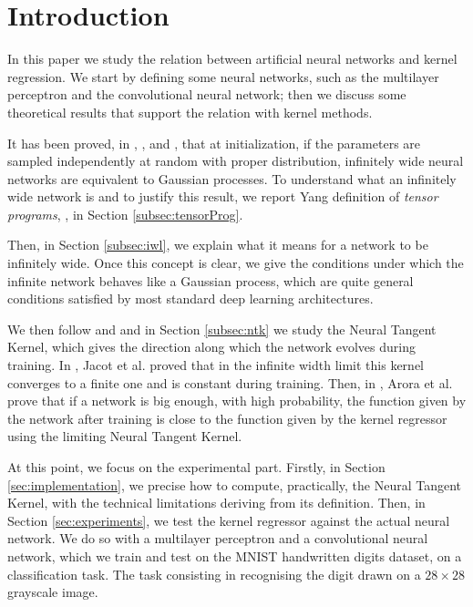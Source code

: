 \documentclass[11pt,notitlepage]{article}
\numberwithin{equation}{section}
\theoremstyle{remark}
\theoremstyle{definition}
\begin{document}
	\tableofcontents		
	
	\newpage
	    
	\section{Introduction}\label{sec:Introduction}
	In this paper we study the relation between artificial neural networks and kernel regression.
	We start by defining some neural networks, such as the multilayer perceptron and the convolutional neural network; then we discuss some theoretical results that support the relation with kernel methods.
	
	It has been proved, in \cite{neal2012bayesian}, \cite{jacot2018neural}, and \cite{yang2019scaling}, that at initialization, if the parameters are sampled independently at random with proper distribution, infinitely wide neural networks are equivalent to Gaussian processes.
	To understand what an infinitely wide network is and to justify this result, we report Yang definition of \emph{tensor programs}, \cite{yang2019scaling}, in Section \ref{subsec:tensorProg}.
	
	Then, in Section \ref{subsec:iwl}, we explain what it means for a network to be infinitely wide.
	Once this concept is clear, we give the conditions under which the infinite network behaves like a Gaussian process, which are quite general conditions satisfied by most standard deep learning architectures.
	
	We then follow \cite{jacot2018neural} and \cite{arora2019exact} and in Section \ref{subsec:ntk} we study the Neural Tangent Kernel, which gives the direction along which the network evolves during training.
	In \cite{jacot2018neural}, Jacot et al. proved that in the infinite width limit this kernel converges to a finite one and is constant during training.
	Then, in \cite{arora2019exact}, Arora et al. prove that if a network is big enough, with high probability, the function given by the network after training is close to the function given by the kernel regressor using the limiting Neural Tangent Kernel.
	
	At this point, we focus on the experimental part.
	Firstly, in Section \ref{sec:implementation}, we precise how to compute, practically, the Neural Tangent Kernel, with the technical limitations deriving from its definition.
	Then, in Section \ref{sec:experiments}, we test the kernel regressor against the actual neural network.
	We do so with a multilayer perceptron and a convolutional neural network, which we train and test on the MNIST handwritten digits dataset, on a classification task.
	The task consisting in recognising the digit drawn on a $28 \times 28$ grayscale image.
	
\end{document}
